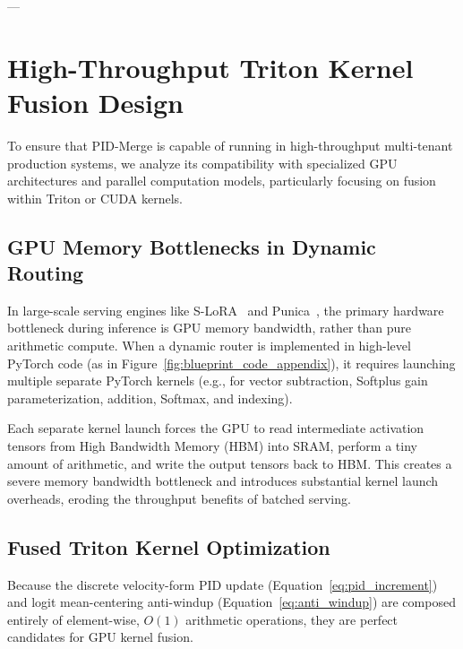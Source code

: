 ---

\section{High-Throughput Triton Kernel Fusion Design}
\label{sec:appendix_triton}

To ensure that PID-Merge is capable of running in high-throughput multi-tenant production systems, we analyze its compatibility with specialized GPU architectures and parallel computation models, particularly focusing on fusion within Triton or CUDA kernels.

\subsection{GPU Memory Bottlenecks in Dynamic Routing}
In large-scale serving engines like S-LoRA~\cite{s-lora} and Punica~\cite{chen2023punica}, the primary hardware bottleneck during inference is GPU memory bandwidth, rather than pure arithmetic compute. When a dynamic router is implemented in high-level PyTorch code (as in Figure~\ref{fig:blueprint_code_appendix}), it requires launching multiple separate PyTorch kernels (e.g., for vector subtraction, Softplus gain parameterization, addition, Softmax, and indexing). 

Each separate kernel launch forces the GPU to read intermediate activation tensors from High Bandwidth Memory (HBM) into SRAM, perform a tiny amount of arithmetic, and write the output tensors back to HBM. This creates a severe memory bandwidth bottleneck and introduces substantial kernel launch overheads, eroding the throughput benefits of batched serving.

\subsection{Fused Triton Kernel Optimization}
Because the discrete velocity-form PID update (Equation~\ref{eq:pid_increment}) and logit mean-centering anti-windup (Equation~\ref{eq:anti_windup}) are composed entirely of element-wise, $O(1)$ arithmetic operations, they are perfect candidates for GPU kernel fusion. 

